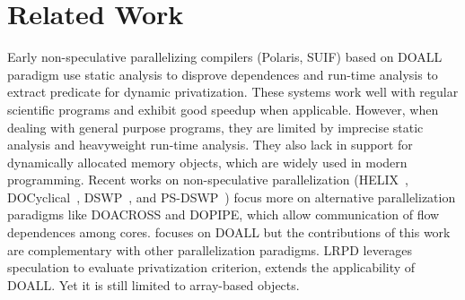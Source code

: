 \section{Related Work}






Early non-speculative parallelizing compilers (Polaris, SUIF) based on
DOALL paradigm use static analysis to disprove dependences and run-time
analysis to extract predicate for dynamic privatization. These systems work
well with regular scientific programs and exhibit good speedup when
applicable. However, when dealing with general purpose programs, they are
limited by imprecise static analysis and heavyweight run-time analysis.
They also lack in support for dynamically allocated memory objects, which
are widely used in modern programming. Recent works on non-speculative
parallelization (HELIX~\cite{simone:12:cgo}, DOCyclical~\cite{yu2016cyclical}, DSWP~\cite{ottoni:05:micro}, and PS-DSWP~\cite{raman:08a:cgo}) focus more on alternative
parallelization paradigms like DOACROSS and DOPIPE, which allow
communication of flow dependences among cores. \name focuses on DOALL but
the contributions of this work are complementary with other parallelization
paradigms. LRPD leverages speculation to evaluate privatization criterion,
extends the applicability of DOALL. Yet it is still limited to array-based
objects.

